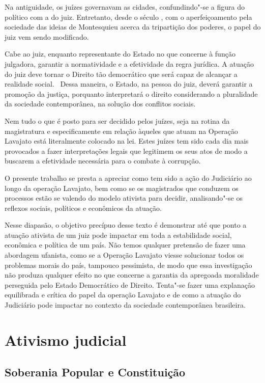 Na antiguidade, os juízes governavam as cidades, confundindo"-se a figura
do político com a do juiz. Entretanto, desde o século , com o
aperfeiçoamento pela sociedade das ideias de Montesquieu acerca da
tripartição dos poderes, o papel do juiz vem sendo modificado.

Cabe ao juiz, enquanto representante do Estado no que concerne à função
julgadora, garantir a normatividade e a efetividade da regra jurídica. A
atuação do juiz deve tornar o Direito tão democrático que será capaz de
alcançar a realidade social.~ Dessa maneira, o Estado, na pessoa do
juiz, deverá garantir a promoção da justiça, porquanto interpretará o direito considerando a pluralidade da
sociedade contemporânea, na solução dos conflitos sociais.

Nem tudo o que é posto para ser decidido pelos juízes, seja na rotina da
magistratura e especificamente em relação àqueles que atuam na Operação
Lavajato está literalmente colocado na lei. Estes juízes tem sido cada
dia mais provocados a fazer interpretações legais que legitimem os seus
atos de modo a buscarem a efetividade necessária para o combate à
corrupção.

O presente trabalho se presta a apreciar como tem sido a ação do
Judiciário ao longo da operação Lavajato, bem como se os magistrados que
conduzem os processos estão se valendo do modelo ativista para decidir,
analisando"-se os reflexos sociais, políticos e econômicos da atuação.

Nesse diapasão, o objetivo precípuo desse texto é demonstrar até que
ponto a atuação ativista de um juiz pode impactar em toda a estabilidade
social, econômica e política de um país. Não temos qualquer pretensão de
fazer uma abordagem ufanista, como se a Operação Lavajato viesse
solucionar todos os problemas morais do país, tampouco pessimista, de
modo que essa investigação não produza qualquer efeito no que concerne a
garantia da apregoada moralidade perseguida pelo Estado Democrático de
Direito. Tenta"-se fazer uma explanação equilibrada e crítica do papel da
operação Lavajato e de como a atuação do Judiciário pode impactar no
contexto da sociedade contemporânea brasileira.

\section{Ativismo judicial}

\subsection{Soberania Popular e Constituição}


